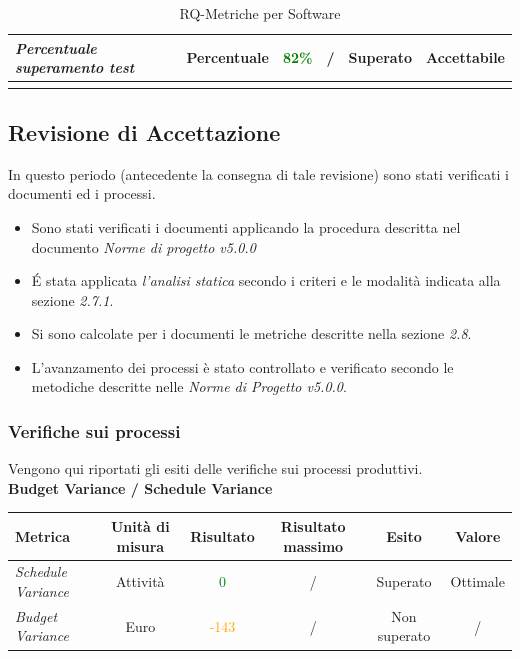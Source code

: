 {\begin{longtable}{|>{\centering}m{2cm}|c|c|c|c|c|}
  	
  	\emph{Percentuale superamento test} & {Percentuale} & \textcolor{Green}{82\%} & / & Superato & Accettabile\\ \hline
  	
  	 
  	\caption{RQ-Metriche per Software}\\
  \end{longtable}

  \subsection{Revisione di Accettazione}
  
  In questo periodo (antecedente la consegna di tale revisione) sono stati verificati i documenti ed i processi.
  
  \begin{itemize}
  	\item Sono stati verificati i documenti applicando la procedura descritta nel documento \emph{Norme di progetto v5.0.0}
  	\item \'E stata applicata \emph{l'analisi statica} secondo i criteri e le modalità indicata alla sezione \emph{2.7.1}.
  	\item Si sono calcolate per i documenti le metriche descritte nella sezione \emph{2.8}.
  	
  	\item L’avanzamento dei processi è stato controllato e verificato secondo le metodiche descritte nelle \emph{Norme di Progetto v5.0.0}.
  	
  \end{itemize}
  \subsubsection{Verifiche sui processi}
  
  Vengono qui riportati gli esiti delle verifiche sui processi produttivi.\\
  
  
  \textbf{Budget Variance / Schedule Variance}
  \begin{longtable}{|>{\centering}m{2cm}|c|c|c|c|c|}
  	\hline
  	\textbf{Metrica} & \textbf{Unità di misura} & \textbf{Risultato} & \textbf{Risultato massimo} & \textbf{Esito} & \textbf{Valore}\\
  	\hline
  	\endhead
  	\emph{Schedule Variance} & {Attività} & \textcolor{Green}{0} & / & Superato & Ottimale\\ \hline
  	\emph{Budget Variance} & {Euro} & \textcolor{Orange}{-143} & / & Non superato & /\\ \hline
  	

\end{longtable}}

